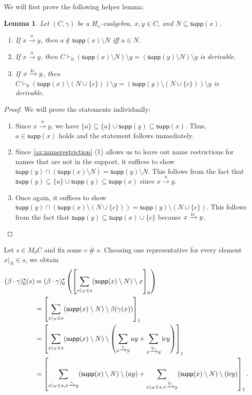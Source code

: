 \documentclass[11pt,a4paper]{amsart}
\newtheorem{lemma}[lemma]{Lemma}
\newcommand{\fresh}{\mathbin{\#}}
\newcommand{\supp}{\mathsf{supp}}
\theoremstyle{plain}
\newcommand{\midmid}{\hspace{0.2ex}{\rule[-0.1ex]{0.6pt}{1.65ex}}\hspace{0.2ex}}
\newcommand{\scriptmidmid}{\hspace{0.2ex}{\rule[-0.1ex]{0.6pt}{1.1ex}}\hspace{0.2ex}}
\newcommand{\newletter}[1]{{\midmid}#1}
\newcommand{\scriptnew}[1]{{\scriptmidmid}#1}
\numberwithin{equation}{section}
\newcommand{\+}[1]{\mathcal{#1}\xspace}
\theoremstyle{definition}
\begin{document}
We will first prove the following helper lemma:
\begin{lemma}
  \label{lem:explicit-kleisli-star-helper}
  Let $(C,\gamma)$ be a $H_\omega$-coalgebra, $x, y \in C$, and $N \subseteq \supp(x)$.
  \begin{enumerate}
    \item\label{itm:explicit-kleisli-star-free-cond}
      If $x \xrightarrow{a} y$, then $a \notin \supp(x) \setminus N$ iff $a \in N$.
    \item\label{itm:explicit-kleisli-star-free-eq}
      If $x \xrightarrow{a} y$, then $C \vdash_0 (\supp(x) \setminus N) \setminus y = (\supp(y) \setminus N) \setminus y$ is derivable.
    \item\label{itm:explicit-kleisli-star-bound-eq}
      If $x \xrightarrow{\scriptnew{c}} y$, then $C \vdash_0 (\supp(x) \setminus (N \cup \{c\})) \setminus y = (\supp(y) \setminus (N \cup \{c\})) \setminus y$ is derivable.
  \end{enumerate}
\end{lemma}
\begin{proof}
  We will prove the statements individually:
  \begin{enumerate}
    \item
      Since $x\xrightarrow{a}y$, we have $\{a\} \subseteq \{a\} \cup \supp(y) \subseteq \supp(x)$.
      Thus, $a \in \supp(x)$ holds and the statement follows immediately.
    \item
      Since \eqref{ax:namerestriction} (1) allows us to leave out name restrictions for names that are not in the support, it suffices to show $\supp(y) \cap (\supp(x) \setminus N) = \supp(y) \setminus N$.
      This follows from the fact that $\supp(y) \subseteq \{a\} \cup \supp(y) \subseteq \supp(x)$ since $x\xrightarrow{a}y$.
    \item
      Once again, it suffices to show $\supp(y) \cap (\supp(x) \setminus (N \cup \{c\})) = \supp(y) \setminus (N \cup \{c\})$.
      This follows from the fact that $\supp(y) \subseteq \supp(x) \cup \{c\}$ because $x \xrightarrow{\scriptnew{c}} y$.
  \end{enumerate}
\end{proof}

Let $s \in M_0C$ and fix some $c \fresh s$.
Choosing one representative for every element $x|_N \in s$, we obtain
\begin{align*}
  (\beta \cdot \gamma)^\star_0(s)
  &= (\beta \cdot \gamma)^\star_0\left( \left[ \sum_{x|_N \in s} (\supp(x) \setminus N) \setminus x \right]_0 \right) \\
  &= \left[ \sum_{x|_N \in s} (\supp(x) \setminus N) \setminus \beta(\gamma(x)) \right]_1 \\
  &= \left[ \sum_{x|_N \in s} (\supp(x) \setminus N) \setminus \left( \sum_{x \xrightarrow{a} y} ay + \sum_{x \xrightarrow{\scriptnew{c}} y} \newletter{c}y \right) \right]_1 \\
  &= \left[ \sum_{x|_N \in s, x \xrightarrow{a} y} (\supp(x) \setminus N) \setminus (ay) + \sum_{x|_N \in s, x \xrightarrow{\scriptnew{c}} y} (\supp(x) \setminus N) \setminus (\newletter{c}y) \right]_1.
\end{align*}
\end{document}

